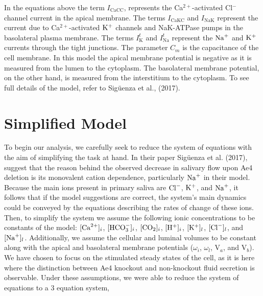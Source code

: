 \documentclass{svjour3}
\newcommand{\bc}{[{\rm Ca}^{2+}]_i}
\newcommand{\kplus}{{\rm K}^+}
\newcommand{\blkplus}{[{\rm K}^+]_l}
\newcommand{\na}{{\rm Na}^+}
\newcommand{\blna}{[{\rm Na}^+]_l}
\newcommand{\bhco}{[{\rm HCO}_3^-]_i}
\newcommand{\cl}{{\rm Cl}^-}
\newcommand{\bcot}{[{\rm CO}_2]_i}
\newcommand{\bhplus}{[{\rm H}^+]_i}
\newcommand{\blcl}{[{\rm Cl}^-]_l}
\begin{document}
In the equations above the term $I_{\text{CaCC}}$, represents the Ca$^{2+}$-activated Cl$^-$ channel current in the apical membrane. The terms $I_{\text{CaKC}}$ and $I_{\text{NaK}}$ represent the current due to Ca$^{2+}$-activated $\kplus$ channels and NaK-ATPase pumps in the basolateral plasma membrane. The terms $I_\text{K}^t$ and $I_{\text{Na}}^t$ represent the $\na$ and $\kplus$ currents through the tight junctions. The parameter $C_m$ is the capacitance of the cell membrane. In this model the apical membrane potential is negative as it is measured from the lumen to the cytoplasm. The basolateral membrane potential, on the other hand, is measured from the interstitium to the cytoplasm. To see full details of the model, refer to Sig{\"u}enza et al., (2017).

\section{Simplified Model}
To begin our analysis, we carefully seek to reduce the system of equations with the aim of simplifying the task at hand. In their paper Sig{\"u}enza et al. (2017), suggest that the reason behind the observed decrease in salivary flow upon Ae4 deletion is its monovalent cation dependence, particularly $\na$ in their model.
Because the main ions present in primary saliva are $\cl$, $\kplus$, and $\na$, it follows that if the  model suggestions are correct, the system's main dynamics could be conveyed by the equations describing the rates of change of these ions. Then, to simplify the system we assume the following ionic concentrations to be constants of the model: $\bc$, $\bhco$, $\bcot$, $\bhplus$, $\blkplus$, $\blcl$, and $\blna$. Additionally, we assume the cellular and luminal volumes to be constant along with the apical and basolateral membrane potentials ($\omega_i$, $\omega_l$, V$_a$, and V$_b$). We have chosen to focus on the stimulated steady states of the cell, as it is here where the distinction between Ae4 knockout and non-knockout fluid secretion is observable. Under these assumptions, we were able to reduce the system of equations to a 3 equation system,\par
\end{document}
